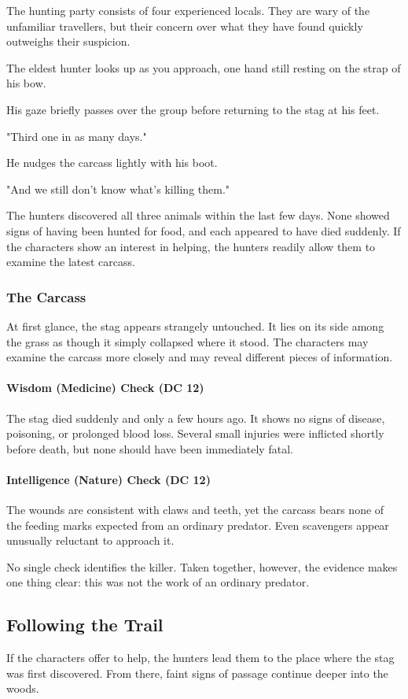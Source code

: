 {\entryfont The hunting party consists of four experienced locals. They are wary of the unfamiliar travellers, but their concern over what they have found quickly outweighs their suspicion.
\begin{DndReadAloud}
	The eldest hunter looks up as you approach, one hand still resting on the strap of his bow.

	His gaze briefly passes over the group before returning to the stag at his feet.

	"Third one in as many days."

	He nudges the carcass lightly with his boot.

	"And we still don't know what's killing them."
\end{DndReadAloud}
{\noindent\entryfont The hunters discovered all three animals within the last few days. None showed signs of having been hunted for food, and each appeared to have died suddenly. If the characters show an interest in helping, the hunters readily allow them to examine the latest carcass.}
\subsubsection*{The Carcass}
{\entryfont At first glance, the stag appears strangely untouched. It lies on its side among the grass as though it simply collapsed where it stood. The characters may examine the carcass more closely and may reveal different pieces of information.
\paragraph*{Wisdom (Medicine) Check (DC 12)} The stag died suddenly and only a few hours ago. It shows no signs of disease, poisoning, or prolonged blood loss. Several small injuries were inflicted shortly before death, but none should have been immediately fatal.
\paragraph*{Intelligence (Nature) Check (DC 12)} The wounds are consistent with claws and teeth, yet the carcass bears none of the feeding marks expected from an ordinary predator. Even scavengers appear unusually reluctant to approach it.

No single check identifies the killer. Taken together, however, the evidence makes one thing clear: this was not the work of an ordinary predator.}
\subsection*{Following the Trail}
{\entryfont If the characters offer to help, the hunters lead them to the place where the stag was first discovered. From there, faint signs of passage continue deeper into the woods.

}}

